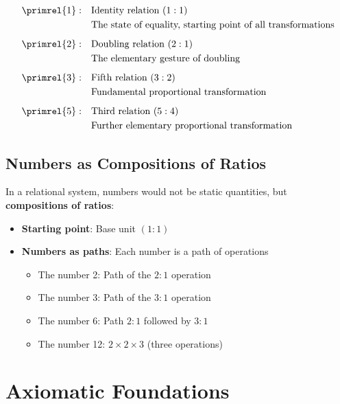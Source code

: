 	\begin{definition}
		\begin{align}
			\primrel{1}: \quad &\text{Identity relation } (1:1) \\
			&\text{The state of equality, starting point of all transformations} \\[0.5em]
			\primrel{2}: \quad &\text{Doubling relation } (2:1) \\
			&\text{The elementary gesture of doubling} \\[0.5em]
			\primrel{3}: \quad &\text{Fifth relation } (3:2) \\
			&\text{Fundamental proportional transformation} \\[0.5em]
			\primrel{5}: \quad &\text{Third relation } (5:4) \\
			&\text{Further elementary proportional transformation}
		\end{align}
	\end{definition}
	
	\subsection{Numbers as Compositions of Ratios}
	
	In a relational system, numbers would not be static quantities, but \textbf{compositions of ratios}:
	
	\begin{itemize}
		\item \textbf{Starting point}: Base unit $(1:1)$
		\item \textbf{Numbers as paths}: Each number is a path of operations
		\begin{itemize}
			\item The number 2: Path of the $2:1$ operation
			\item The number 3: Path of the $3:1$ operation  
			\item The number 6: Path $2:1$ followed by $3:1$
			\item The number 12: $2 \times 2 \times 3$ (three operations)
		\end{itemize}
	\end{itemize}
	
	\section{Axiomatic Foundations}
	
